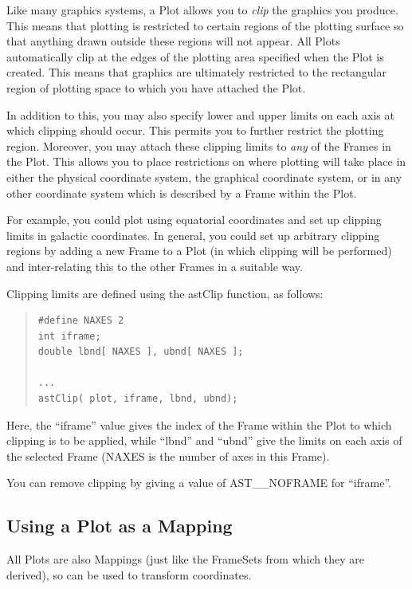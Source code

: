 \documentclass[twoside,11pt]{article}
\newcommand{\htmlref}[2]{#1}
\begin{document}
Like many graphics systems, a \htmlref{Plot}{Plot} allows you to {\em{clip}} the graphics
you produce. This means that plotting is restricted to certain regions
of the plotting surface so that anything drawn outside these regions
will not appear.  All Plots automatically clip at the edges of the
plotting area specified when the Plot is created. This means that
graphics are ultimately restricted to the rectangular region of
plotting space to which you have attached the Plot.

In addition to this, you may also specify lower and upper limits on
each axis at which clipping should occur. This permits you to further
restrict the plotting region. Moreover, you may attach these clipping
limits to {\em{any}} of the Frames in the Plot. This allows you to
place restrictions on where plotting will take place in either the
physical coordinate system, the graphical coordinate system, or in any
other coordinate system which is described by a \htmlref{Frame}{Frame} within the Plot.

For example, you could plot using equatorial coordinates and set up
clipping limits in galactic coordinates. In general, you could set up
arbitrary clipping regions by adding a new Frame to a Plot (in which
clipping will be performed) and inter-relating this to the other
Frames in a suitable way.

Clipping limits are defined using the \htmlref{astClip}{astClip} function, as follows:

\begin{quote}
\small
\begin{verbatim}
#define NAXES 2
int iframe;
double lbnd[ NAXES ], ubnd[ NAXES ];

...
astClip( plot, iframe, lbnd, ubnd);
\end{verbatim}
\normalsize
\end{quote}

Here, the ``iframe'' value gives the index of the Frame within the
Plot to which clipping is to be applied, while ``lbnd'' and ``ubnd''
give the limits on each axis of the selected Frame (NAXES is the
number of axes in this Frame).

You can remove clipping by giving a value of AST\_\_NOFRAME for ``iframe''.

\subsection{Using a Plot as a Mapping}

All Plots are also Mappings (just like the FrameSets from which they
are derived), so can be used to transform coordinates.
\end{document}
